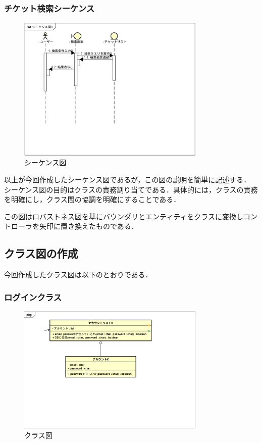 \documentclass{ltjsarticle}
\begin{document}
\subsubsection{チケット検索シーケンス}
\begin{figure}[H]
    \centering
    \includegraphics[width=0.8\textwidth]{src/Sequence2.png}
    \caption{シーケンス図}
    \label{fig:sequence2}
\end{figure}

以上が今回作成したシーケンス図であるが，この図の説明を簡単に記述する．
シーケンス図の目的はクラスの責務割り当てである．具体的には，クラスの責務を明確にし，クラス間の協調を明確にすることである．

この図はロバストネス図を基にバウンダリとエンティティをクラスに変換しコントローラを矢印に置き換えたものである．

\subsection{クラス図の作成}
今回作成したクラス図は以下のとおりである．
\subsubsection{ログインクラス}
\begin{figure}[H]
    \centering
    \includegraphics[width=0.8\textwidth]{src/Class.png}
    \caption{クラス図}
    \label{fig:class}
\end{figure}
\end{document}
